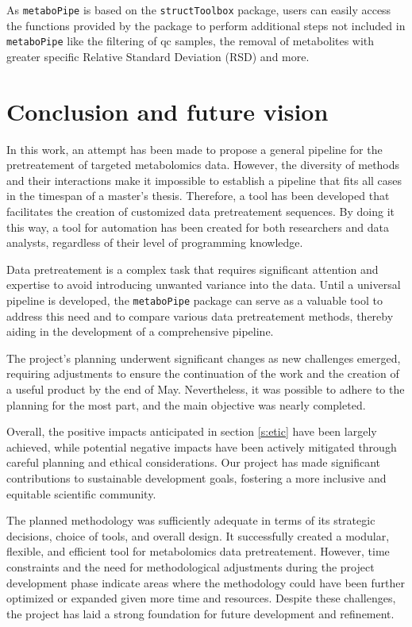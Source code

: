 \documentclass[ENG, BIB]{TFUOC}%
\begin{document}
As \texttt{metaboPipe} is based on the \texttt{structToolbox} package, users can easily access the functions provided by the package to perform additional steps not included in \texttt{metaboPipe} like the filtering of \gls{qc} samples, the removal of metabolites with greater specific Relative Standard Deviation (RSD) and more.




\chapter{Conclusion and future vision}
In this work, an attempt has been made to propose a general pipeline for the pretreatement of targeted metabolomics data. However, the diversity of methods and their interactions make it impossible to establish a pipeline that fits all cases in the timespan of a master's thesis. Therefore, a tool has been developed that facilitates the creation of customized data pretreatement sequences. By doing it this way, a tool for automation has been created for both researchers and data analysts, regardless of their level of programming knowledge.

Data pretreatement is a complex task that requires significant attention and expertise to avoid introducing unwanted variance into the data. Until a universal pipeline is developed, the \texttt{metaboPipe} package can serve as a valuable tool to address this need and to compare various data pretreatement methods, thereby aiding in the development of a comprehensive pipeline.

The project's planning underwent significant changes as new challenges emerged, requiring adjustments to ensure the continuation of the work and the creation of a useful product by the end of May. Nevertheless, it was possible to adhere to the planning for the most part, and the main objective was nearly completed.

Overall, the positive impacts anticipated in section \ref{s:etic} have been largely achieved, while potential negative impacts have been actively mitigated through careful planning and ethical considerations. Our project has made significant contributions to sustainable development goals, fostering a more inclusive and equitable scientific community.

The planned methodology was sufficiently adequate in terms of its strategic decisions, choice of tools, and overall design. It successfully created a modular, flexible, and efficient tool for metabolomics data pretreatement. However, time constraints and the need for methodological adjustments during the project development phase indicate areas where the methodology could have been further optimized or expanded given more time and resources. Despite these challenges, the project has laid a strong foundation for future development and refinement.
\end{document}
